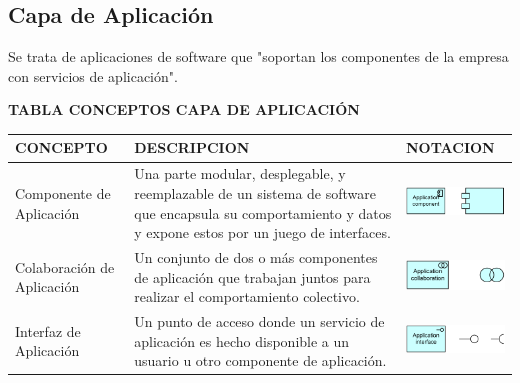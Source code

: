\subsection{Capa de Aplicación}

Se trata de aplicaciones de software que "soportan los componentes de la empresa con servicios de aplicación".

\begin{table}[H]
	\centering\textbf{TABLA CONCEPTOS CAPA DE APLICACIÓN}
	\centering
	\begin{tabular}{| m{4cm} | m{4cm} | m{4cm} | }
		\hline
		\centering\vspace{1.52mm}CONCEPTO & \centering\vspace{1.52mm}DESCRIPCION &\vspace{1.52mm}NOTACION \\
		\hline
		\centering\vspace{1.52mm}Componente de Aplicación & \vspace{1.52mm}Una parte modular, desplegable, y reemplazable de un sistema de software que encapsula su comportamiento y datos y expone estos por un juego de interfaces.& \vspace{1.52mm}\includegraphics[width=40mm]{arquitectura/imagenes/21} \\
		\hline
		\centering\vspace{1.52mm}Colaboración de Aplicación & \vspace{1.52mm}Un conjunto de dos o más componentes de aplicación que trabajan juntos para realizar el comportamiento colectivo.& \vspace{1.52mm}\includegraphics[width=40mm]{arquitectura/imagenes/22} \\
		\hline
		\centering\vspace{1.52mm}Interfaz de Aplicación & \vspace{1.52mm}Un punto de acceso donde un servicio de aplicación es hecho disponible a un usuario u otro componente de aplicación.& \vspace{1.52mm}\includegraphics[width=40mm]{arquitectura/imagenes/23} \\

\end{tabular}
\end{table}
